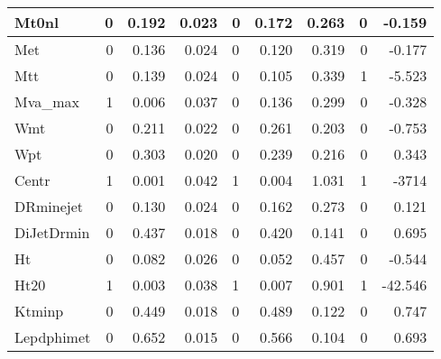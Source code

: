 \begin{landscape}
\begin{table}[h]
{\begin{tabular}{|l|r|r|r|l|r|r|r|r|}
\textsf{Mt0nl} & 0 & 0.192 & 0.023 & 0 & 0.172 & 0.263 & 0 & -0.159 \\ \hline
\textsf{Met} & 0 & 0.136 & 0.024 & 0 & 0.120 & 0.319 & 0 & -0.177 \\ \hline
\textsf{Mtt} & 0 & 0.139 & 0.024 & 0 & 0.105 & 0.339 & 1 & -5.523 \\ \hline
\textsf{Mva\_max} & 1 & 0.006 & 0.037 & 0 & 0.136 & 0.299 & 0 & -0.328 \\ \hline
\textsf{Wmt} & 0 & 0.211 & 0.022 & 0 & 0.261 & 0.203 & 0 & -0.753 \\ \hline
\textsf{Wpt} & 0 & 0.303 & 0.020 & 0 & 0.239 & 0.216 & 0 & 0.343 \\ \hline
\textsf{Centr} & 1 & 0.001 & 0.042 & 1 & 0.004 & 1.031 & 1 & -3714 \\ \hline
\textsf{DRminejet} & 0 & 0.130 & 0.024 & 0 & 0.162 & 0.273 & 0 & 0.121 \\ \hline
\textsf{DiJetDrmin} & 0 & 0.437 & 0.018 & 0 & 0.420 & 0.141 & 0 & 0.695 \\ \hline
\textsf{Ht} & 0 & 0.082 & 0.026 & 0 & 0.052 & 0.457 & 0 & -0.544 \\ \hline
\textsf{Ht20} & 1 & 0.003 & 0.038 & 1 & 0.007 & 0.901 & 1 & -42.546 \\ \hline
\textsf{Ktminp} & 0 & 0.449 & 0.018 & 0 & 0.489 & 0.122 & 0 & 0.747 \\ \hline
\textsf{Lepdphimet} & 0 & 0.652 & 0.015 & 0 & 0.566 & 0.104 & 0 & 0.693 \\ \hline
\end{tabular}
\label{tab:m4j-tests}
}
\end{table}

\end{landscape}